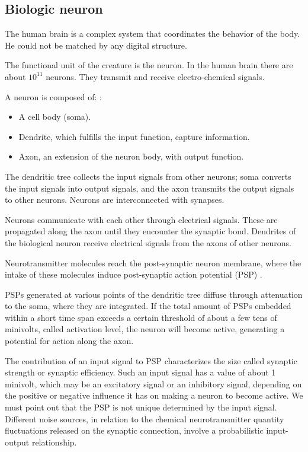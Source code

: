\subsection{Biologic neuron}

The human brain is a complex system that coordinates the behavior of the body. He could not be matched by any digital structure.

The functional unit of the creature is the neuron. In the human brain there are about $ 10 ^ {11} $ neurons. They transmit and receive electro-chemical signals.

A neuron is composed of: \cite{toulouse}:
\begin{itemize}
    \item A cell body (soma).
    \item Dendrite, which fulfills the input function, capture information.
    \item Axon, an extension of the neuron body, with output function.
\end{itemize}

The dendritic tree collects the input signals from other neurons; soma converts the input signals into output signals, and the axon transmits the output signals to other neurons. Neurons are interconnected with synapses.

Neurons communicate with each other through electrical signals. These are propagated along the axon until they encounter the synaptic bond. Dendrites of the biological neuron receive electrical signals from the axons of other neurons.

Neurotransmitter molecules reach the post-synaptic neuron membrane, where the intake of these molecules induce post-synaptic action potential (PSP) \cite{calculNeuronal}.

PSPs generated at various points of the dendritic tree diffuse through attenuation to the soma, where they are integrated. If the total amount of PSPs embedded within a short time span exceeds a certain threshold of about a few tens of minivolts, called activation level, the neuron will become active, generating a potential for action along the axon.

The contribution of an input signal to PSP characterizes the size called synaptic strength or synaptic efficiency. Such an input signal has a value of about 1 minivolt, which may be an excitatory signal or an inhibitory signal, depending on the positive or negative influence it has on making a neuron to become active. We must point out that the PSP is not unique determined by the input signal. Different noise sources, in relation to the chemical neurotransmitter quantity fluctuations released on the synaptic connection, involve a probabilistic input-output relationship.

